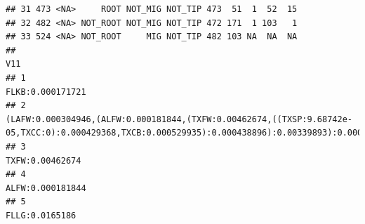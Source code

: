 \documentclass[]{article}
\begin{document}
\begin{verbatim}
## 31 473 <NA>     ROOT NOT_MIG NOT_TIP 473  51  1  52  15
## 32 482 <NA> NOT_ROOT NOT_MIG NOT_TIP 472 171  1 103   1
## 33 524 <NA> NOT_ROOT     MIG NOT_TIP 482 103 NA  NA  NA
##                                                                                                                                                                                                                                                                                                                                                                                                                  V11
## 1                                                                                                                                                                                                                                                                                                                                                                                                   FLKB:0.000171721
## 2                                                                                                                                                                                                                                                    (LAFW:0.000304946,(ALFW:0.000181844,(TXFW:0.00462674,((TXSP:9.68742e-05,TXCC:0):0.000429368,TXCB:0.000529935):0.000438896):0.00339893):0.000450879):0.000633288
## 3                                                                                                                                                                                                                                                                                                                                                                                                    TXFW:0.00462674
## 4                                                                                                                                                                                                                                                                                                                                                                                                   ALFW:0.000181844
## 5                                                                                                                                                                                                                                                                                                                                                                                                     FLLG:0.0165186

\end{verbatim}
\end{document}
